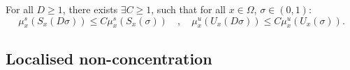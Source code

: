 \documentclass[a4paper]{article}
\theoremstyle{definition}
\begin{document}
For all $D \geq 1$, there exists $\exists C \geq 1$, such that for all $x \in \Omega$, $\sigma \in (0,1)$:
$$  \mu_x^s( S_x(D \sigma) ) \leq C \mu_x^s(S_x(\sigma)) \quad ,  \quad \mu_x^u( U_x(D \sigma) ) \leq C \mu_x^u(U_x(\sigma)) . $$

\subsection{Localised non-concentration}\label{subsection:localisednoncon}

\end{document}
